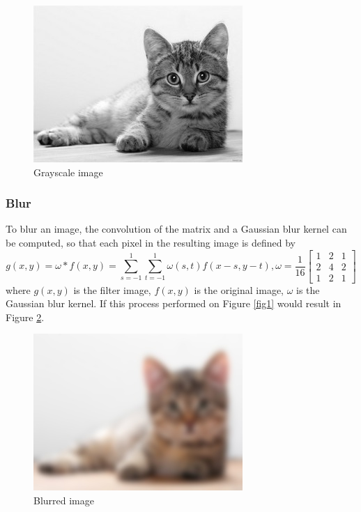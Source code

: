 \documentclass{../mathhomework}
\begin{document}
\begin{figure}[H]
    \begin{center}
        \includegraphics{figures/gray.jpg}
    \end{center}

    \caption{Grayscale image}
    \label{fig3}
\end{figure}

\subsubsection{Blur}
To blur an image, the convolution of the matrix and a Gaussian blur kernel can be computed, so that each pixel in the resulting image is defined by
\begin{equation*}
    g(x,y) = \omega * f(x,y) = \sum^1_{s=-1} \sum^1_{t=-1} \omega(s,t) f(x - s, y - t), \omega = \frac{1}{16}\begin{bmatrix}
        1 & 2 & 1 \\ 
        2 & 4 & 2 \\
        1 & 2 & 1
    \end{bmatrix}
\end{equation*}
where $g(x,y)$ is the filter image, $f(x,y)$ is the original image, $\omega$ is the Gaussian blur kernel.
If this process performed on Figure \ref{fig1} would result in Figure \ref{fig4}.

\begin{figure}[H]
    \begin{center}
        \includegraphics{figures/gaussian.jpg}
    \end{center}

    \caption{Blurred image}
    \label{fig4}
\end{figure}
\end{document}

